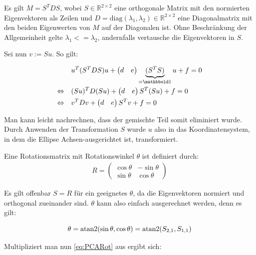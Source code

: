 Es gilt $M = S^TDS$, wobei $S\in\mathbb{R}^{2\times2}$ eine orthogonale Matrix mit den normierten Eigenvektoren als Zeilen und $D = \text{diag}(\lambda_1, \lambda_2)\in\mathbb{R}^{2\times2}$ eine Diagonalmatrix mit den beiden Eigenwerten von $M$ auf der Diagonalen ist. Ohne Beschränkung der Allgemeinheit gelte $\lambda_1 <= \lambda_2$, andernfalls vertausche die Eigenvektoren in $S$. 

Sei nun $v := Su$.
So gilt:

\begin{equation} \label{eq:PCARot}
\begin{aligned}
&u^T(S^TDS)u +\begin{pmatrix}d & e\end{pmatrix}\underbrace{(S^TS)}_{=\ind}u + f = 0 \\
\Leftrightarrow\quad &(Su)^TD(Su) +\begin{pmatrix}d & e\end{pmatrix}S^T(Su) + f = 0 \\
\Leftrightarrow\quad &v^{T}Dv +\begin{pmatrix}d & e\end{pmatrix}S^Tv + f = 0 
\end{aligned}
\end{equation}

Man kann leicht nachrechnen, dass der gemischte Teil somit eliminiert wurde. Durch Anwenden der Transformation $S$ wurde $u$ also in das Koordinatensystem, in dem die Ellipse Achsen-ausgerichtet ist,  transformiert.

Eine Rotationsmatrix mit Rotationswinkel $\theta$ ist definiert durch: 
\begin{equation}
\begin{aligned}
R = \begin{pmatrix}\cos\theta & -\sin\theta \\ \sin\theta & \cos\theta\end{pmatrix}
\end{aligned}
\end{equation}

Es gilt offenbar $S = R$ für ein geeignetes $\theta$, da die Eigenvektoren normiert und orthogonal zueinander sind. $\theta$ kann also einfach ausgerechnet werden, denn es gilt:

\begin{equation*}
\theta = \text{atan2}(\sin\theta, \cos\theta) = \text{atan2}(S_{2,1}, S_{1,1})
\end{equation*}

Multipliziert man nun \ref{eq:PCARot} aus ergibt sich:

